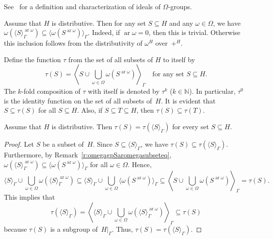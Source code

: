 \documentclass{jgcc}
\DeclareMathOperator{\ar}{ar}
\newcommand{\Add}[1]{#1|_\Gamma}
\newcommand{\gp}[1]{\langle#1\rangle_\Gamma}
\newcommand{\GP}[1]{\left\langle#1\right\rangle_\Gamma}
\newcommand{\N}{\mathbb N}
\begin{document}
See~\cite[Section~3, Theorem~4A, and its corollary]{Hig56}
for a definition and characterization of ideals of
$\Omega$-groups.

\begin{rem}
\label{r:omegagpSaromegasubseteq}
Assume that $H$ is distributive. Then for any set
$S\subseteq H$ and any $\omega\in\Omega$, we have
$\omega(\gp
S^{\ar\omega})\subseteq\gp{\omega(S^{\ar\omega})}$. Indeed,
if $\ar\omega=0$, then this is trivial. Otherwise this
inclusion follows from the distributivity of $\omega^H$
over~$+^H$.
\end{rem}

Define the function $\tau$ from the set of all subsets of
$H$ to itself by
\begin{equation}
\label{e:tau}
\tau(S)
=\GP{S\cup\bigcup_{\omega\in\Omega}\omega(S^{\ar\omega})}
\quad\text{for any set }S\subseteq H.
\end{equation}
The $k$-fold composition of $\tau$ with itself is denoted by
$\tau^k$ ($k\in\N$). In particular, $\tau^0$ is the identity
function on the set of all subsets of~$H$. It is evident
that $S\subseteq\tau(S)$ for all $S\subseteq H$. Also, if
$S\subseteq T\subseteq H$, then $\tau(S)\subseteq\tau(T)$.

\begin{lem}
\label{l:tauSeqtaugpS}
Assume that $H$ is distributive. Then $\tau(S)=\tau(\gp S)$
for every set $S\subseteq H$.
\end{lem}
\begin{proof}
Let $S$ be a subset of~$H$. Since $S\subseteq\gp S$, we have
$\tau(S)\subseteq\tau(\gp S)$. Furthermore, by
Remark~\ref{r:omegagpSaromegasubseteq}, $\omega(\gp
S^{\ar\omega})\subseteq\gp{\omega(S^{\ar\omega})}$ for all
$\omega\in\Omega$. Hence,
\[
\gp S\cup\bigcup_{\omega\in\Omega}\omega(\gp S^{\ar\omega})
\subseteq\gp S\cup\bigcup_{\omega\in\Omega}
\gp{\omega(S^{\ar\omega})}\subseteq\GP{S\cup
\bigcup_{\omega\in\Omega}\omega(S^{\ar\omega})}=\tau(S).
\]
This implies that
\[
\tau(\gp S)=\GP{\gp S\cup\bigcup_{\omega\in\Omega}\omega(\gp
S^{\ar\omega})}\subseteq\tau(S)
\]
because $\tau(S)$ is a subgroup of~$\Add H$. Thus,
$\tau(S)=\tau(\gp S)$.
\end{proof}
\end{document}
